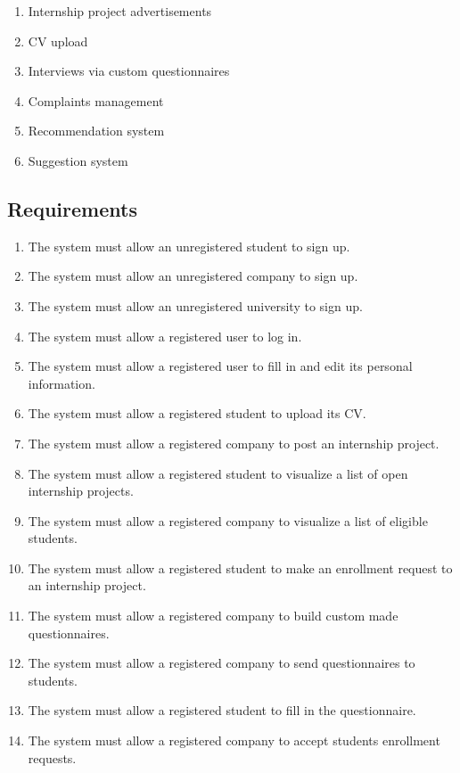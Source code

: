 \begin{enumerate}[label=\textbf{KF\arabic* -}]
    \item Internship project advertisements
    \item CV upload
    \item Interviews via custom questionnaires
    \item Complaints management
    \item Recommendation system
    \item Suggestion system
\end{enumerate}

\subsection{Requirements}

\begin{enumerate}[label=\textbf{R\arabic* -}]
    \item The system must allow an unregistered student to sign up.
    \item The system must allow an unregistered company to sign up.
    \item The system must allow an unregistered university to sign up.
    \item The system must allow a registered user to log in.
    \item The system must allow a registered user to fill in and edit its personal information.
    \item The system must allow a registered student to upload its CV.
    \item The system must allow a registered company to post an internship project.
    \item The system must allow a registered student to visualize a list of open internship projects.
    \item The system must allow a registered company to visualize a list of eligible students.
    \item The system must allow a registered student to make an enrollment request to an internship project.
    \item The system must allow a registered company to build custom made questionnaires.
    \item The system must allow a registered company to send questionnaires to students.
    \item The system must allow a registered student to fill in the questionnaire.
    \item The system must allow a registered company to accept students enrollment requests.

\end{enumerate}

